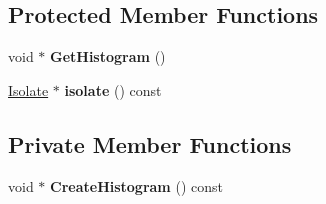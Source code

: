 \subsection*{Protected Member Functions}
\begin{DoxyCompactItemize}
\item 
void $\ast$ {\bfseries Get\+Histogram} ()\hypertarget{classv8_1_1internal_1_1_histogram_a64814df2fbed982aab10659a38645a4c}{}\label{classv8_1_1internal_1_1_histogram_a64814df2fbed982aab10659a38645a4c}

\item 
\hyperlink{classv8_1_1internal_1_1_isolate}{Isolate} $\ast$ {\bfseries isolate} () const \hypertarget{classv8_1_1internal_1_1_histogram_aa26e393fdf6c7d2016ab312727cd68b9}{}\label{classv8_1_1internal_1_1_histogram_aa26e393fdf6c7d2016ab312727cd68b9}

\end{DoxyCompactItemize}
\subsection*{Private Member Functions}
\begin{DoxyCompactItemize}
\item 
void $\ast$ {\bfseries Create\+Histogram} () const \hypertarget{classv8_1_1internal_1_1_histogram_a52d086ad3f239655a4a80054949b4c28}{}\label{classv8_1_1internal_1_1_histogram_a52d086ad3f239655a4a80054949b4c28}

\end{DoxyCompactItemize}
